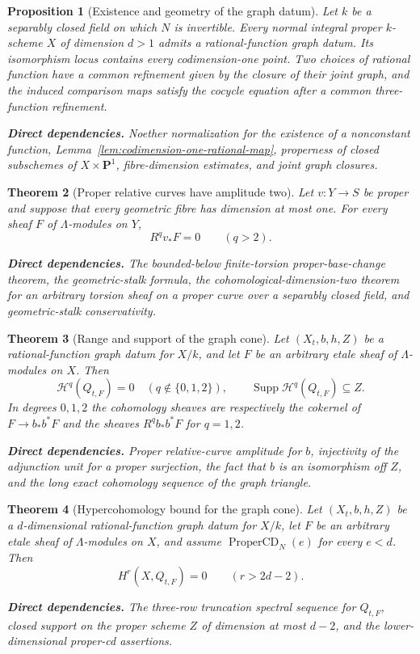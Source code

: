 \documentclass[10pt]{article}
\newtheorem{theorem}{Theorem}[section]
\newtheorem{proposition}[theorem]{Proposition}
\theoremstyle{definition}
\newcommand{\deps}[1]{\par\smallskip\noindent\textbf{Direct dependencies.} #1}
\begin{document}
\begin{proposition}[Existence and geometry of the graph datum]
\label{prop:graph-datum}
Let $k$ be a separably closed field on which $N$ is invertible.  Every normal
integral proper $k$-scheme $X$ of dimension $d>1$ admits a rational-function
graph datum.  Its isomorphism locus contains every
codimension-one point.  Two choices of rational function have a common
refinement given by the closure of their joint graph, and the induced
comparison maps satisfy the cocycle equation after a common three-function
refinement.
\deps{Noether normalization for the existence of a nonconstant function,
Lemma~\ref{lem:codimension-one-rational-map}, properness of closed subschemes
of $X\times\mathbf P^1$, fibre-dimension estimates, and joint graph
closures.}
\end{proposition}

\begin{theorem}[Proper relative curves have amplitude two]
\label{thm:proper-relative-curve-cd}
Let $v:Y\to S$ be proper and suppose that every geometric fibre has
dimension at most one.  For every sheaf $F$ of $\Lambda$-modules on $Y$,
\[
 R^qv_*F=0\qquad(q>2).
\]
\deps{The bounded-below finite-torsion proper-base-change theorem, the
geometric-stalk formula, the cohomological-dimension-two theorem for an
arbitrary torsion sheaf on a proper curve over a separably closed field, and
geometric-stalk conservativity.}
\end{theorem}

\begin{theorem}[Range and support of the graph cone]
\label{thm:graph-cone-support}
Let $(X_t,b,h,Z)$ be a rational-function graph datum for $X/k$, and let $F$
be an arbitrary etale sheaf of $\Lambda$-modules on $X$.  Then
\[
 \mathcal H^q(Q_{t,F})=0\quad(q\notin\{0,1,2\}),
 \qquad
 \operatorname{Supp}\mathcal H^q(Q_{t,F})\subseteq Z.
\]
In degrees $0,1,2$ the cohomology sheaves are respectively the cokernel of
$F\to b_*b^*F$ and the sheaves $R^qb_*b^*F$ for $q=1,2$.
\deps{Proper relative-curve amplitude for $b$, injectivity of the adjunction
unit for a proper surjection, the fact that $b$ is an isomorphism off $Z$,
and the long exact cohomology sequence of the graph triangle.}
\end{theorem}

\begin{theorem}[Hypercohomology bound for the graph cone]
\label{thm:graph-cone-hypercohomology}
Let $(X_t,b,h,Z)$ be a $d$-dimensional rational-function graph datum for
$X/k$, let $F$ be an arbitrary etale sheaf of $\Lambda$-modules on $X$, and
assume $\operatorname{ProperCD}_N(e)$ for every $e<d$.  Then
\[
 H^r(X,Q_{t,F})=0\qquad(r>2d-2).
\]
\deps{The three-row truncation spectral sequence for $Q_{t,F}$, closed
support on the proper scheme $Z$ of dimension at most $d-2$, and the
lower-dimensional proper-cd assertions.}
\end{theorem}
\end{document}
